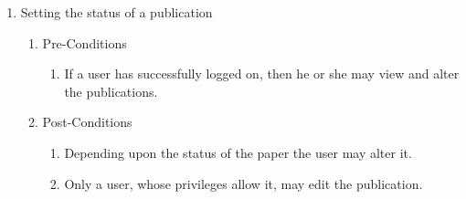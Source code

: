 \documentclass[hidelinks,a4paper,12pt]{article}
\begin{document}
	\begin{enumerate}
		\item  Setting the status of a publication
		
		\begin{enumerate}
			\item  Pre-Conditions
			
			\begin{enumerate}
				\item  If a user has successfully logged on, then he or she may view and alter the publications.
			\end{enumerate}
			
			\item  Post-Conditions
			
			\begin{enumerate}
				\item  Depending upon the status of the paper the user may alter it.
				
				\item  Only a user, whose privileges allow it, may edit the publication. 
			\end{enumerate}
		\end{enumerate}
	\end{enumerate}
	
	\noindent  
	
\end{document}
